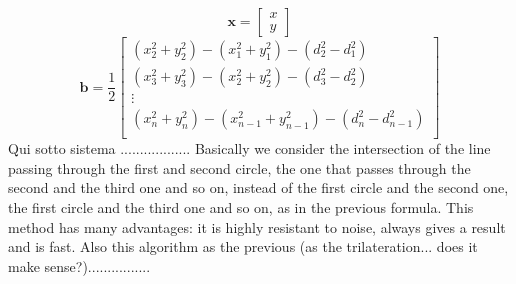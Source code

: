 \documentclass[12pt,twoside]{report}
\begin{document}
$$\mathbf{x}=\begin{bmatrix}
x\\
y
\end{bmatrix}$$
$$\mathbf{b}=\frac{1}{2}\begin{bmatrix}
(x^2_2+y^2_2)-(x_1^2+y^2_1)-(d_2^2-d_1^2)\\
(x^2_3+y^2_3)-(x_2^2+y^2_2)-(d_3^2-d_2^2)\\
\vdots\\
(x^2_n+y^2_n)-(x_{n-1}^2+y^2_{n-1})-(d_n^2-d_{n-1}^2)\\
\end{bmatrix}$$
Qui sotto sistema ..................
Basically we consider the intersection of the line passing through the first and second circle, the one that passes through the second and the third one and so on, instead of the first circle and the second one, the first circle and the third one and so on, as in the previous formula. This method has many advantages: it is highly resistant to noise, always gives a result and is fast. Also this algorithm as the previous (as the trilateration... does it make sense?)................
\clearpage
\end{document}
